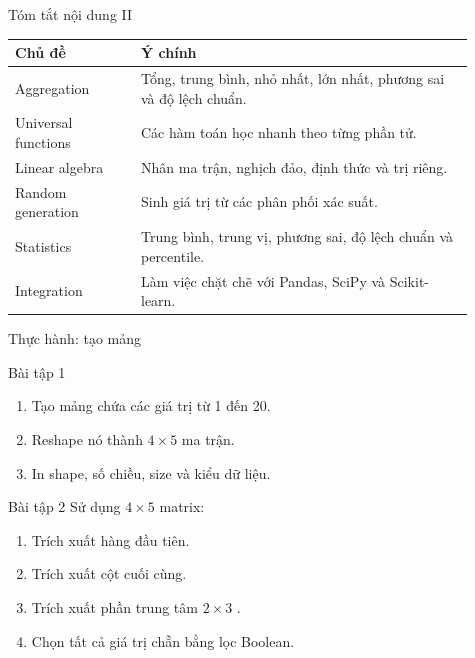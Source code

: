 \documentclass[aspectratio=169,11pt]{beamer}
\begin{document}
\begin{frame}{Tóm tắt nội dung II}
\small
\begin{tabular}{p{0.25\linewidth}p{0.66\linewidth}}
\toprule
\textbf{Chủ đề} & \textbf{Ý chính} \\
\midrule
Aggregation & Tổng, trung bình, nhỏ nhất, lớn nhất, phương sai và độ lệch chuẩn. \\
Universal functions & Các hàm toán học nhanh theo từng phần tử. \\
Linear algebra & Nhân ma trận, nghịch đảo, định thức và trị riêng. \\
Random generation & Sinh giá trị từ các phân phối xác suất. \\
Statistics & Trung bình, trung vị, phương sai, độ lệch chuẩn và percentile. \\
Integration & Làm việc chặt chẽ với Pandas, SciPy và Scikit-learn. \\
\bottomrule
\end{tabular}
\end{frame}

\begin{frame}{Thực hành: tạo mảng}
\small
\begin{block}{Bài tập 1}
\begin{enumerate}
  \item Tạo mảng chứa các giá trị từ 1 đến 20.
  \item Reshape nó thành \(4 \times 5\) ma trận.
  \item In shape, số chiều, size và kiểu dữ liệu.
\end{enumerate}
\end{block}
\begin{block}{Bài tập 2}
Sử dụng \(4 \times 5\) matrix:
\begin{enumerate}
  \item Trích xuất hàng đầu tiên.
  \item Trích xuất cột cuối cùng.
  \item Trích xuất phần trung tâm \(2 \times 3\) .
  \item Chọn tất cả giá trị chẵn bằng lọc Boolean.
\end{enumerate}
\end{block}
\end{frame}
\end{document}
